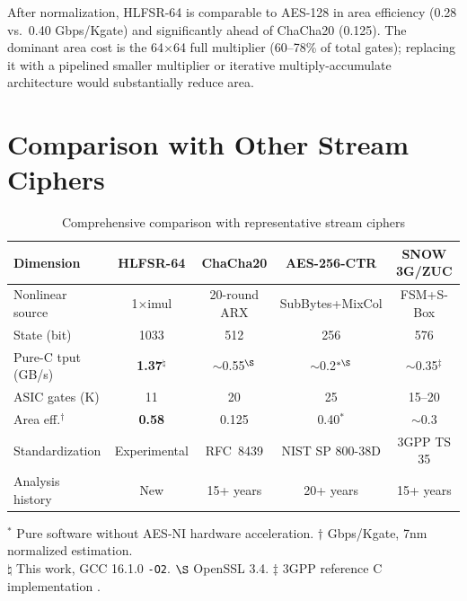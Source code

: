\documentclass[11pt,a4paper]{article}
\begin{document}
After normalization, HLFSR-64 is comparable to AES-128 in area efficiency
(0.28 vs.\ 0.40 Gbps/Kgate) and significantly ahead of ChaCha20 (0.125).
The dominant area cost is the 64$\times$64 full multiplier (60--78\% of
total gates); replacing it with a pipelined smaller multiplier or iterative
multiply-accumulate architecture would substantially reduce area.

\section{Comparison with Other Stream Ciphers}

\begin{table}[H]
\centering
\footnotesize
\begin{tabular}{@{}lcccc@{}}
\toprule
\textbf{Dimension} & \textbf{HLFSR-64} & \textbf{ChaCha20} & \textbf{AES-256-CTR} & \textbf{SNOW 3G/ZUC} \\
\midrule
Nonlinear source    & 1$\times$imul     & 20-round ARX   & SubBytes+MixCol  & FSM+S-Box \\
State (bit)         & 1033              & 512            & 256              & 576 \\
Pure-C tput (GB/s)  & \textbf{1.37}$^\natural$ & $\sim$0.55$^\S$ & $\sim$0.2$^{*\S}$ & $\sim$0.35$^\ddag$ \\
ASIC gates (K)      & 11                & 20             & 25               & 15--20 \\
Area eff.$^\dagger$ & \textbf{0.58}     & 0.125          & 0.40$^*$         & $\sim$0.3 \\
Standardization     & Experimental      & RFC~8439       & NIST SP 800-38D  & 3GPP TS 35 \\
Analysis history    & New               & 15+ years      & 20+ years        & 15+ years \\
\bottomrule
\end{tabular}
\caption{Comprehensive comparison with representative stream ciphers}
\label{tab:comparison}
\end{table}

\smallskip
{\footnotesize $^*$ Pure software without AES-NI hardware acceleration.
$\dagger$ Gbps/Kgate, 7nm normalized estimation.\\
$\natural$ This work, GCC 16.1.0 \texttt{-O2}. $\S$ OpenSSL 3.4.
$\ddag$ 3GPP reference C implementation \cite{etsi-snow}.}
\end{document}
